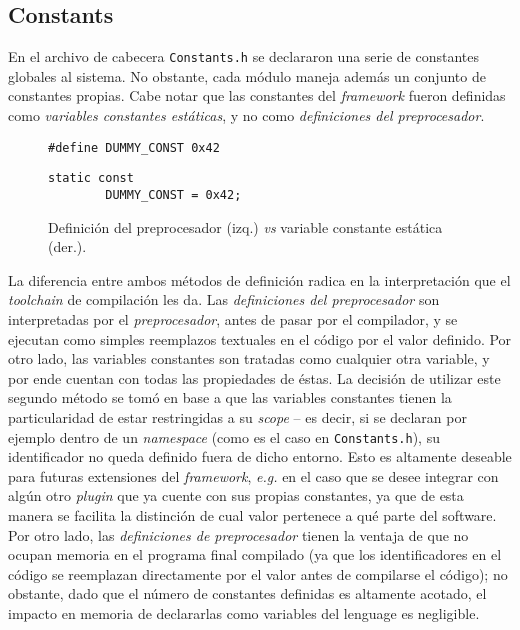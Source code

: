 \subsection{Constants}

En el archivo de cabecera \texttt{Constants.h} se declararon una serie de constantes globales al sistema. No obstante, cada módulo maneja además un conjunto de constantes propias. Cabe notar que las constantes del \emph{framework} fueron definidas como \emph{variables constantes estáticas}, y no como \emph{definiciones del preprocesador}.

\begin{figure}[h]
    \centering
    \begin{minipage}{.49\linewidth}
        \begin{lstlisting}[style=CPP, numbers=none, frame=none, backgroundcolor=\color{white}]
        #define DUMMY_CONST 0x42
        \end{lstlisting}
    \end{minipage}
    \begin{minipage}{.49\linewidth}
        \begin{lstlisting}[style=CPP, numbers=none, frame=l, backgroundcolor=\color{white}]
        static const
        DUMMY_CONST = 0x42;
        \end{lstlisting}
    \end{minipage}
    \caption{Definición del preprocesador (izq.) \emph{vs} variable constante estática (der.).}
\end{figure}

La diferencia entre ambos métodos de definición radica en la interpretación que el \emph{toolchain} de compilación les da. Las \emph{definiciones del preprocesador} son interpretadas por el \emph{preprocesador}, antes de pasar por el compilador, y se ejecutan como simples reemplazos textuales en el código por el valor definido. Por otro lado, las variables constantes son tratadas como cualquier otra variable, y por ende cuentan con todas las propiedades de éstas. La decisión de utilizar este segundo método se tomó en base a que las variables constantes tienen la particularidad de estar restringidas a su \emph{scope} -- es decir, si se declaran por ejemplo dentro de un \emph{namespace} (como es el caso en \texttt{Constants.h}), su identificador no queda definido fuera de dicho entorno.
Esto es altamente deseable para futuras extensiones del \emph{framework}, \emph{e.g.} en el caso que se desee integrar con algún otro \emph{plugin} que ya cuente con sus propias constantes, ya que de esta manera se facilita la distinción de cual valor pertenece a qué parte del software. Por otro lado, las \emph{definiciones de preprocesador} tienen la ventaja de que no ocupan memoria en el programa final compilado (ya que los identificadores en el código se reemplazan directamente por el valor antes de compilarse el código); no obstante, dado que el número de constantes definidas es altamente acotado, el impacto en memoria de declararlas como variables del lenguage es negligible.

